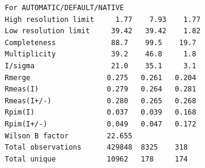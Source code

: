 \documentclass[slides,compress]{beamer}
\begin{document}
\begin{frame}[fragile]
\begin{verbatim}
For AUTOMATIC/DEFAULT/NATIVE
High resolution limit     1.77    7.93    1.77
Low resolution limit     39.42   39.42    1.82
Completeness             88.7    99.5    19.7
Multiplicity             39.2    46.8     1.8
I/sigma                  21.0    35.1     3.1
Rmerge                  0.275   0.261   0.204
Rmeas(I)                0.279   0.264   0.281
Rmeas(I+/-)             0.280   0.265   0.268
Rpim(I)                 0.037   0.039   0.168
Rpim(I+/-)              0.049   0.047   0.172
Wilson B factor         22.655
Total observations      429848  8325    318
Total unique            10962   178     174
\end{verbatim}
\end{frame}


\end{document}
